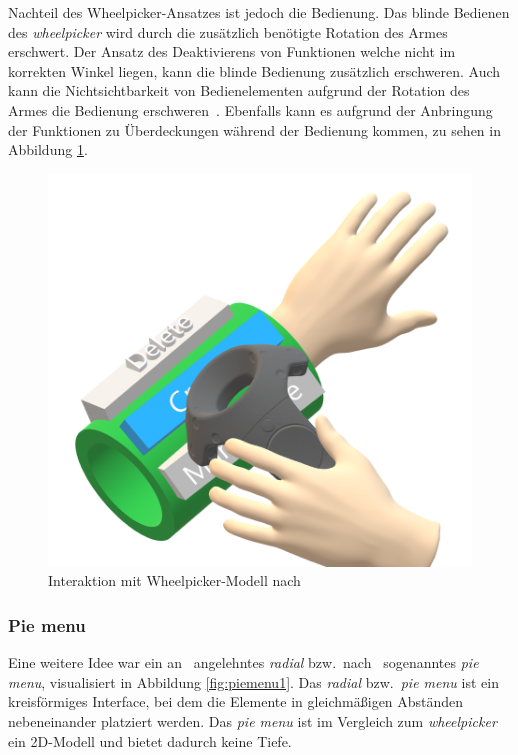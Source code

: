 \noindent Nachteil des Wheelpicker-Ansatzes ist jedoch die Bedienung. Das blinde Bedienen des \textit{wheelpicker} wird durch die zusätzlich benötigte Rotation des  Armes erschwert. Der Ansatz des Deaktivierens von Funktionen welche nicht im korrekten Winkel liegen, kann die blinde Bedienung zusätzlich erschweren. Auch kann die Nichtsichtbarkeit von Bedienelementen aufgrund der Rotation des Armes die Bedienung erschweren~\cite{theoryandpracticebook}. Ebenfalls kann es aufgrund der Anbringung der Funktionen zu Überdeckungen während der Bedienung kommen, zu sehen in Abbildung \ref{fig:wheelpicker2}.

\begin{figure}[h]
\captionsetup{width=.7\linewidth}
\includegraphics[scale=0.5]{Bilder/Hauptteil/konzept9}
\centering
\caption{Interaktion mit Wheelpicker-Modell nach~\cite[p.~33]{wheelpickerpiemenu}}
\label{fig:wheelpicker2}
\end{figure}

\subsubsection*{Pie menu}
\noindent Eine weitere Idee war ein an~\cite{theoryandpracticebook} angelehntes \textit{radial} bzw.~nach~\cite{wheelpickerpiemenu} sogenanntes \textit{pie menu}, visualisiert in Abbildung \ref{fig:piemenu1}. Das \textit{radial} bzw.~\textit{pie menu} ist ein kreisförmiges Interface, bei dem die Elemente in gleichmäßigen Abständen nebeneinander platziert werden. Das \textit{pie menu} ist im Vergleich zum \textit{wheelpicker} ein 2D-Modell und bietet dadurch keine Tiefe.

